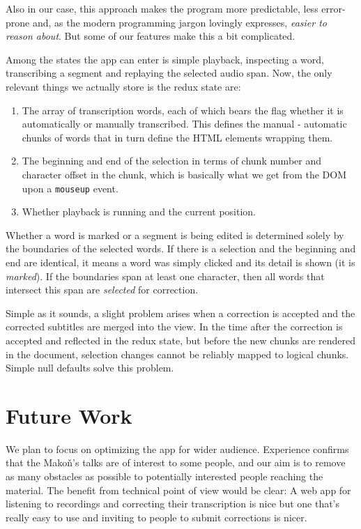 \documentclass{svproc}
\begin{document}
Also in our case, this approach makes the program more predictable, less
error-prone and, as the modern programming jargon lovingly expresses, {\em
easier to reason about}. But some of our features make this a bit complicated.

Among the states the app can enter is simple playback, inspecting a word,
transcribing a segment and replaying the selected audio span. Now, the only
relevant things we actually store is the redux state are:
\begin{enumerate}
\item{
    The array of transcription words, each of which bears the flag whether it is
    automatically or manually transcribed. This defines the manual - automatic
    chunks of words that in turn define the HTML elements wrapping them.
}
\item{
    The beginning and end of the selection in terms of chunk number and
    character offset in the chunk, which is basically what we get from the DOM
    upon a \texttt{mouseup} event.
}
\item{Whether playback is running and the current position.}
\end{enumerate}

Whether a word is marked or a segment is being edited is determined solely by
the boundaries of the selected words. If there is a selection and the beginning
and end are identical, it means a word was simply clicked and its detail is
shown (it is {\em marked}). If the boundaries span at least one character, then
all words that intersect this span are {\em selected} for correction.

Simple as it sounds, a slight problem arises when a correction is accepted and
the corrected subtitles are merged into the view. In the time after the
correction is accepted and reflected in the redux state, but before the new
chunks are rendered in the document, selection changes cannot be reliably mapped
to logical chunks. Simple null defaults solve this problem.

\section{Future Work}

We plan to focus on optimizing the app for wider audience. Experience confirms
that the Mako\v{n}'s talks are of interest to some people, and our aim is to
remove as many obstacles as possible to potentially interested people reaching
the material. The benefit from technical point of view would be clear: A web app
for listening to recordings and correcting their transcription is nice but one
that's really easy to use and inviting to people to submit corrections is nicer.
\end{document}
